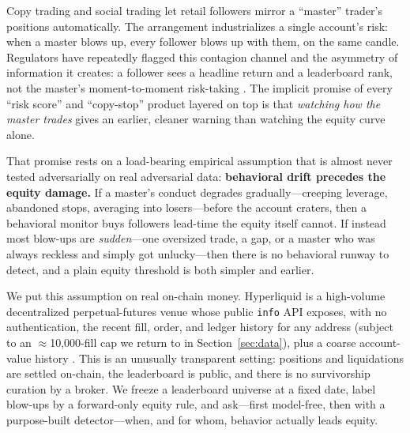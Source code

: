 \documentclass[11pt,a4paper]{article}
\begin{document}
Copy trading and social trading let retail followers mirror a ``master'' trader's
positions automatically. The arrangement industrializes a single account's risk:
when a master blows up, every follower blows up with them, on the same candle.
Regulators have repeatedly flagged this contagion channel and the asymmetry of
information it creates: a follower sees a headline return and a leaderboard rank,
not the master's moment-to-moment risk-taking
\citep{iosco2025imitative,esma2023copytrading,pelster2019socialtrading}.
The implicit promise of every ``risk score'' and ``copy-stop'' product layered on
top is that \emph{watching how the master trades} gives an earlier, cleaner warning
than watching the equity curve alone.

That promise rests on a load-bearing empirical assumption that is almost never
tested adversarially on real adversarial data: \textbf{behavioral drift precedes
the equity damage.} If a master's conduct degrades gradually---creeping leverage,
abandoned stops, averaging into losers---before the account craters, then a
behavioral monitor buys followers lead-time the equity itself cannot. If instead
most blow-ups are \emph{sudden}---one oversized trade, a gap, or a master who was
always reckless and simply got unlucky---then there is no behavioral runway to
detect, and a plain equity threshold is both simpler and earlier.

We put this assumption on real on-chain money. Hyperliquid is a high-volume
decentralized perpetual-futures venue whose public \texttt{info} API exposes, with
no authentication, the recent fill, order, and ledger history for any address
(subject to an $\approx$10{,}000-fill cap we return to in Section~\ref{sec:data}),
plus a coarse account-value history \citep{hyperliquid2024docs}. This is an unusually
transparent setting: positions and liquidations are settled on-chain, the
leaderboard is public, and there is no survivorship curation by a broker. We
freeze a leaderboard universe at a fixed date, label blow-ups by a forward-only
equity rule, and ask---first model-free, then with a purpose-built detector---when,
and for whom, behavior actually leads equity.
\end{document}
